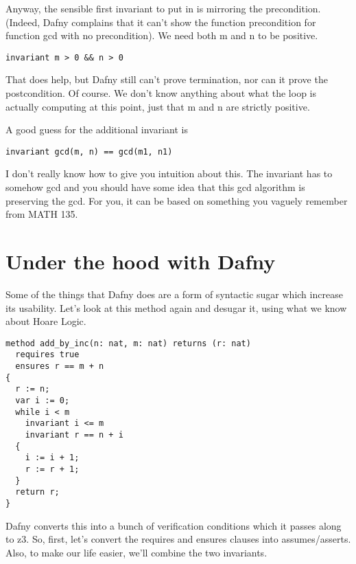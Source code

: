 \documentclass[11pt]{article}
\begin{document}
Anyway, the sensible first invariant to put in is mirroring the precondition. (Indeed, Dafny complains that
it can't show the function precondition for function \textsf{gcd} with no precondition). We need both \textsf{m}
and \textsf{n} to be positive.
\begin{lstlisting}[language=dafny]
  invariant m > 0 && n > 0
\end{lstlisting}
That does help, but Dafny still can't prove termination, nor can it prove the postcondition. Of course.
We don't know anything about what the loop is actually computing at this point, just that \textsf{m} and
\textsf{n} are strictly positive.

A good guess for the additional invariant is
\begin{lstlisting}[language=dafny]
  invariant gcd(m, n) == gcd(m1, n1)
\end{lstlisting}
I don't really know how to give you intuition about this. The
invariant has to somehow \textsf{gcd} and you should have some idea
that this gcd algorithm is preserving the gcd. For you, it can be
based on something you vaguely remember from MATH 135.

\section*{Under the hood with Dafny}
Some of the things that Dafny does are a form of syntactic sugar which
increase its usability. Let's look at this method again and desugar it, using
what we know about Hoare Logic.
\begin{lstlisting}[language=dafny]
method add_by_inc(n: nat, m: nat) returns (r: nat)
  requires true
  ensures r == m + n
{
  r := n;
  var i := 0;
  while i < m
    invariant i <= m
    invariant r == n + i
  {
    i := i + 1;
    r := r + 1;
  }
  return r;
}
\end{lstlisting}
Dafny converts this into a bunch of verification conditions which it passes along to z3.
So, first, let's convert the \textsf{requires} and \textsf{ensures} clauses into \textsf{assume}s/\textsf{assert}s.
Also, to make our life easier, we'll combine the two invariants.
\end{document}
